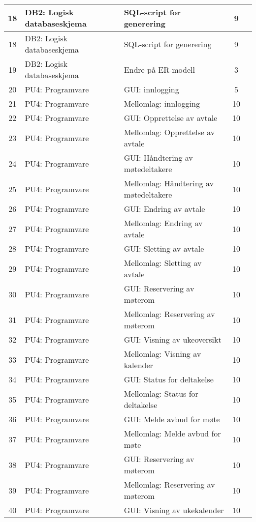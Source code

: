 \begin{table}
{\begin{tabularx}{1.3\textwidth}{|c|l|X|c|c|}
	18 & DB2: Logisk databaseskjema & SQL-script for generering & 9 & \\ \hline
	18 & DB2: Logisk databaseskjema & SQL-script for generering & 9 & \\ \hline
	19 & DB2: Logisk databaseskjema & Endre på ER-modell & 3 & \\ \hline
	20 & PU4: Programvare & GUI: innlogging & 5 & \\ \hline
	21 & PU4: Programvare & Mellomlag: innlogging & 10 & \\ \hline
	22 & PU4: Programvare & GUI: Opprettelse av avtale & 10 & \\ \hline
	23 & PU4: Programvare & Mellomlag: Opprettelse av avtale & 10 & \\ \hline
	24 & PU4: Programvare & GUI: Håndtering av møtedeltakere & 10 & \\ \hline
	25 & PU4: Programvare & Mellomlag: Håndtering av møtedeltakere & 10 & \\ \hline
	26 & PU4: Programvare & GUI: Endring av avtale & 10 & \\  \hline
	27 & PU4: Programvare & Mellomlag: Endring av avtale & 10 & \\ \hline
	28 & PU4: Programvare & GUI: Sletting av avtale & 10 & \\ \hline
	29 & PU4: Programvare & Mellomlag: Sletting av avtale & 10 & \\ \hline
	30 & PU4: Programvare & GUI: Reservering av møterom & 10 & \\ \hline
	31 & PU4: Programvare & Mellomlag: Reservering av møterom & 10 & \\ \hline
	32 & PU4: Programvare & GUI: Visning av ukeoversikt & 10 & \\ \hline
	33 & PU4: Programvare & Mellomlag: Visning av kalender  & 10 & \\ \hline
	34 & PU4: Programvare & GUI: Status for deltakelse & 10 & \\ \hline
	35 & PU4: Programvare & Mellomlag: Status for deltakelse  & 10 & \\ \hline
	36 & PU4: Programvare & GUI: Melde avbud for møte & 10 & \\ \hline
	37 & PU4: Programvare & Mellomlag: Melde avbud for møte  & 10 & \\ \hline
	38 & PU4: Programvare & GUI: Reservering av møterom & 10 & \\ \hline
	39 & PU4: Programvare & Mellomlag: Reservering av møterom & 10 & \\ \hline
	40 & PU4: Programvare & GUI: Visning av ukekalender & 10 & \\ \hline

\end{tabularx}}
\end{table}

